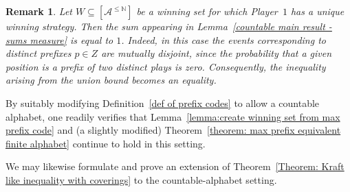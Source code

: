 \documentclass[a4,12pt]{article}%
\newtheorem{remark}[theorem]{Remark}
\begin{document}
\begin{remark}
Let $W \subseteq [\mathcal{A}^{\le \mathbb{N}}]$ be a winning set for which Player~$1$ has a unique winning strategy. Then the sum appearing in Lemma~\ref{countable main result - sums measure} is equal to $1$. Indeed, in this case the events corresponding to distinct prefixes $p \in Z$ are mutually disjoint, since the probability that a given position is a prefix of two distinct plays is zero. Consequently, the inequality arising from the union bound becomes an equality.
\end{remark}

\medskip

By suitably modifying Definition~\ref{def of prefix codes} to allow a countable alphabet, one readily verifies that Lemma~\ref{lemma:create winning set from max prefix code} and (a slightly modified) Theorem~\ref{theorem: max prefix equivalent finite alphabet} continue to hold in this setting.

\medskip

We may likewise formulate and prove an extension of Theorem~\ref{Theorem: Kraft like inequality with coverings} to the countable-alphabet setting.
\end{document}
